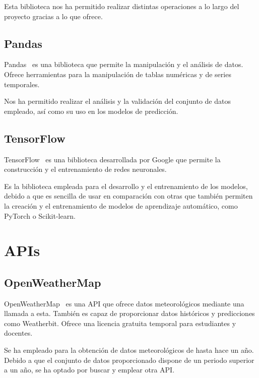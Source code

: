 Esta biblioteca nos ha permitido realizar distintas operaciones a lo largo del proyecto gracias a lo que ofrece.

\subsection{Pandas}

 Pandas~\cite{pandas} es una biblioteca que permite la manipulación y el análisis de datos. Ofrece herramientas para la manipulación de tablas numéricas y de series temporales.

\par

Nos ha permitido realizar el análisis y la validación del conjunto de datos empleado, así como su uso en los modelos de predicción.

\subsection{TensorFlow}

TensorFlow~\cite{tensorflow} es una biblioteca desarrollada por Google que permite la construcción y el entrenamiento de redes neuronales.

\par

Es la biblioteca empleada para el desarrollo y el entrenamiento de los modelos, debido a que es sencilla de usar en comparación con otras que también permiten la creación y el entrenamiento de modelos de aprendizaje automático, como PyTorch o Scikit-learn.

\section{APIs}

\subsection{OpenWeatherMap}

OpenWeatherMap~\cite{openweathermap} es una API que ofrece datos meteorológicos mediante una llamada a esta. También es capaz de proporcionar datos históricos y predicciones como Weatherbit. Ofrece una licencia gratuita temporal para estudiantes y docentes.

\par

Se ha empleado para la obtención de datos meteorológicos de hasta hace un año. Debido a que el conjunto de datos proporcionado dispone de un periodo superior a un año, se ha optado por buscar y emplear otra API.


